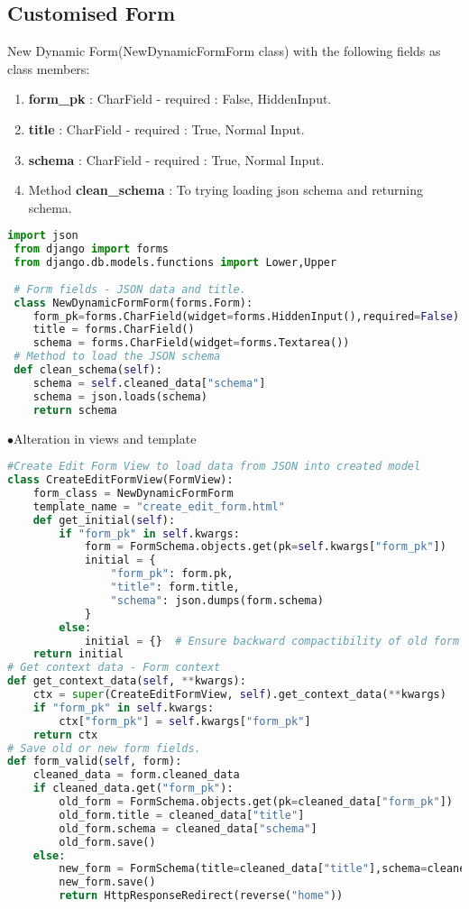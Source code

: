 \subsection{Customised Form}
New Dynamic Form(NewDynamicFormForm class) with the following fields as class members:
\begin{enumerate}
\item \textbf{form\_pk} : CharField - required : False, HiddenInput.
\item \textbf{title} : CharField - required : True, Normal Input.
\item \textbf{schema} : CharField - required : True, Normal Input.
\item Method \textbf{clean\_schema} : To trying loading json schema and returning schema.
\end{enumerate}
\newpage
\begin{lstlisting}[language=python,numbers=none]
 import json
 from django import forms
 from django.db.models.functions import Lower,Upper
 
 # Form fields - JSON data and title.
 class NewDynamicFormForm(forms.Form):
 	form_pk=forms.CharField(widget=forms.HiddenInput(),required=False)
 	title = forms.CharField()
 	schema = forms.CharField(widget=forms.Textarea()) 
 # Method to load the JSON schema
 def clean_schema(self):
 	schema = self.cleaned_data["schema"]
 	schema = json.loads(schema)
 	return schema
\end{lstlisting}
$\bullet${Alteration in views and template}
\begin{lstlisting}[language=python,numbers=none]
#Create Edit Form View to load data from JSON into created model
class CreateEditFormView(FormView):
	form_class = NewDynamicFormForm
	template_name = "create_edit_form.html"
	def get_initial(self):
		if "form_pk" in self.kwargs:
			form = FormSchema.objects.get(pk=self.kwargs["form_pk"])
			initial = {
				"form_pk": form.pk,
				"title": form.title,
				"schema": json.dumps(form.schema)
			}
		else:
			initial = {}  # Ensure backward compactibility of old form layout
	return initial
# Get context data - Form context
def get_context_data(self, **kwargs):
	ctx = super(CreateEditFormView, self).get_context_data(**kwargs)
	if "form_pk" in self.kwargs:
		ctx["form_pk"] = self.kwargs["form_pk"]
	return ctx
# Save old or new form fields.
def form_valid(self, form):
	cleaned_data = form.cleaned_data
	if cleaned_data.get("form_pk"):
		old_form = FormSchema.objects.get(pk=cleaned_data["form_pk"])
		old_form.title = cleaned_data["title"]
		old_form.schema = cleaned_data["schema"]
		old_form.save()
	else:
		new_form = FormSchema(title=cleaned_data["title"],schema=cleaned_data["schema"])
		new_form.save()
		return HttpResponseRedirect(reverse("home"))
\end{lstlisting}

